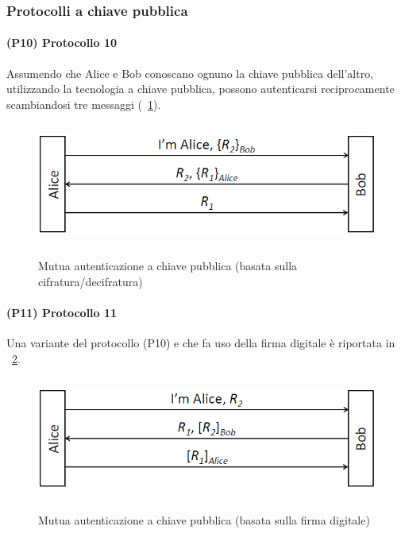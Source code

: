 \subsubsection{Protocolli a chiave pubblica}
\paragraph{(P10) Protocollo 10}
Assumendo che Alice e Bob conoscano ognuno la chiave pubblica dell'altro, utilizzando la tecnologia a chiave pubblica, possono autenticarsi reciprocamente scambiandosi tre messaggi (\figurename~\ref{fig:ImgS47bis}).
\begin{figure}[htbp]
	\centering%
	\subfigure%
	{\includegraphics[height=4cm, width=12cm, keepaspectratio]{Immagini/autenticazione/ImgS47bis.png}}
	\caption{Mutua autenticazione a chiave pubblica (basata sulla cifratura/decifratura)}\label{fig:ImgS47bis} 	
\end{figure}
\paragraph{(P11) Protocollo 11}
Una variante del protocollo (P10) e che fa uso della firma digitale è riportata in \figurename~\ref{fig:ImgS48bis}. \newline \newline
\begin{figure}[htbp]
	\centering%
	\subfigure%
	{\includegraphics[height=4cm, width=12cm, keepaspectratio]{Immagini/autenticazione/ImgS48bis.png}}
	\caption{Mutua autenticazione a chiave pubblica (basata sulla firma digitale)}\label{fig:ImgS48bis} 	
\end{figure}
